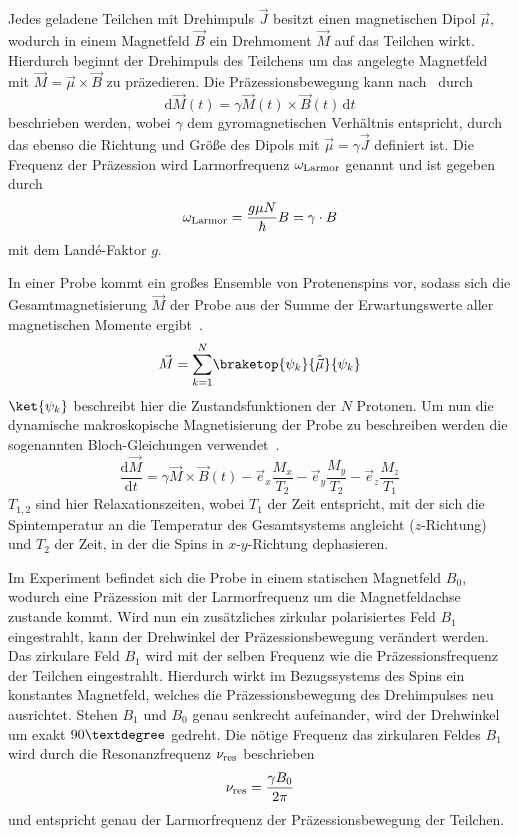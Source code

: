 \documentclass[paper=a4,
	fontsize=10pt,
	DIV=18,
	twocolumn,
	parskip=half
	]{scrartcl}
\numberwithin{equation}{section}    %
\begin{document}
Jedes geladene Teilchen mit Drehimpuls $\vec{J}$ besitzt einen magnetischen Dipol $\vec{\mu}$, wodurch in einem Magnetfeld $\vec{B}$ ein Drehmoment $\vec{M}$ auf das Teilchen wirkt. Hierdurch beginnt der Drehimpuls des Teilchens um das angelegte Magnetfeld mit $\vec{M} = \vec{\mu} \times \vec{B}$ zu präzedieren. Die Präzessionsbewegung kann nach~\citet{anleitung} durch
\begin{equation}
	\mathrm{d}\vec{M}(t) = \gamma\vec{M}(t) \times \vec{B}(t)\,\mathrm{d}t
\end{equation}
beschrieben werden, wobei $\gamma$ dem gyromagnetischen Verhältnis entspricht, durch das ebenso die Richtung und Größe des Dipols mit $\vec{\mu} = \gamma\vec{J}$ definiert ist.
Die Frequenz der Präzession wird Larmorfrequenz $\omega_{\rm Larmor}$ genannt und ist gegeben durch~\citep{mueller}
\begin{equation}
	\omega_{\rm Larmor} = \frac{g \mu N}{\hbar}B = \gamma \cdot B
\end{equation}
mit dem Landé-Faktor $g$.

In einer Probe kommt ein großes Ensemble von Protenenspins vor, sodass sich die Gesamtmagnetisierung $\vec{M}$ der Probe aus der Summe der Erwartungswerte aller magnetischen Momente ergibt~\citep{anleitung}.
\begin{equation}
	\vec{M} = \underset{k=1}{\overset{N}{\sum}} \braketop{\psi_k}{\hat{\vec{\mu}}}{\psi_k}
\end{equation}
$\ket{\psi_k}$ beschreibt hier die Zustandsfunktionen der $N$ Protonen.
Um nun die dynamische makroskopische Magnetisierung der Probe zu beschreiben werden die sogenannten Bloch-Gleichungen verwendet~\citep{anleitung}.
\begin{equation}
	\frac{\mathrm{d}\vec{M}}{\mathrm{d}t} = \gamma\vec{M} \times \vec{B}(t) - \vec{e}_x \frac{M_x}{T_2} - \vec{e}_y \frac{M_y}{T_2} - \vec{e}_z \frac{M_z}{T_1}
	\label{bloch}
\end{equation}
$T_{1,2}$ sind hier Relaxationszeiten, wobei $T_{1}$ der Zeit entspricht, mit der sich die Spintemperatur an die Temperatur des Gesamtsystems angleicht ($z$-Richtung) und $T_2$ der Zeit, in der die Spins in $x$-$y$-Richtung dephasieren.

Im Experiment befindet sich die Probe in einem statischen Magnetfeld $B_0$, wodurch eine Präzession mit der Larmorfrequenz um die Magnetfeldachse zustande kommt. Wird nun ein zusätzliches zirkular polarisiertes Feld $B_1$ eingestrahlt, kann der Drehwinkel der Präzessionsbewegung verändert werden. Das zirkulare Feld $B_1$ wird mit der selben Frequenz wie die Präzessionsfrequenz der Teilchen eingestrahlt. Hierdurch wirkt im Bezugssystems des Spins ein konstantes Magnetfeld, welches die Präzessionsbewegung des Drehimpulses neu ausrichtet. Stehen $B_1$ und $B_0$ genau senkrecht aufeinander, wird der Drehwinkel um exakt $90\textdegree$ gedreht. Die nötige Frequenz das zirkularen Feldes $B_1$ wird durch die Resonanzfrequenz $\nu_{\rm res}$ beschrieben~\citep{anleitung}
\begin{equation}
	\nu_{\rm res} = \frac{\gamma B_0}{2\pi}
\end{equation}
und entspricht genau der Larmorfrequenz der Präzessionsbewegung der Teilchen.
\end{document}
